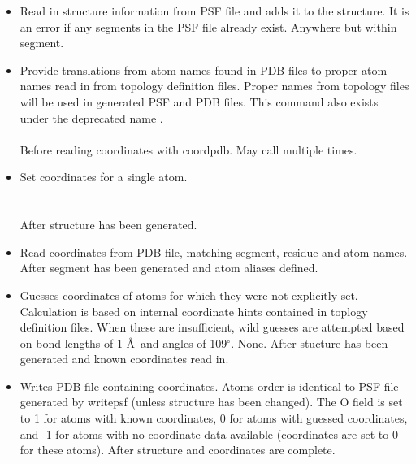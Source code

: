 \begin{itemize}
\item {}
{Read in structure information from PSF file and adds it to the structure.
It is an error if any segments in the PSF file already exist.}
{}
{Anywhere but within segment.}

\item {}
{Provide translations from atom names found in PDB files to proper
atom names read in from topology definition files.  Proper names
from topology files will be used in generated PSF and PDB files.
This command also exists under the deprecated name .}
{\\
\\
}
{Before reading coordinates with coordpdb.  May call multiple times.}

\item {}
{Set coordinates for a single atom.}
{\\
\\
\\
}
{After structure has been generated.}

\item {}
{Read coordinates from PDB file, matching segment, residue and atom names.}
{\\
}
{After segment has been generated and atom aliases defined.}

\item {}
{Guesses coordinates of atoms for which they were not explicitly set.
Calculation is based on internal coordinate hints contained in toplogy
definition files.  When these are insufficient, wild guesses are attempted
based on bond lengths of 1 \AA\ and angles of 109$^\circ$.}
{None.}
{After stucture has been generated and known coordinates read in.}

\item {}
{Writes PDB file containing coordinates.  Atoms order is identical to
PSF file generated by writepsf (unless structure has been changed).
The O field is set to 1 for atoms with known coordinates, 0 for atoms
with guessed coordinates, and -1 for atoms with no coordinate data
available (coordinates are set to 0 for these atoms).}
{}
{After structure and coordinates are complete.}

\end{itemize}

